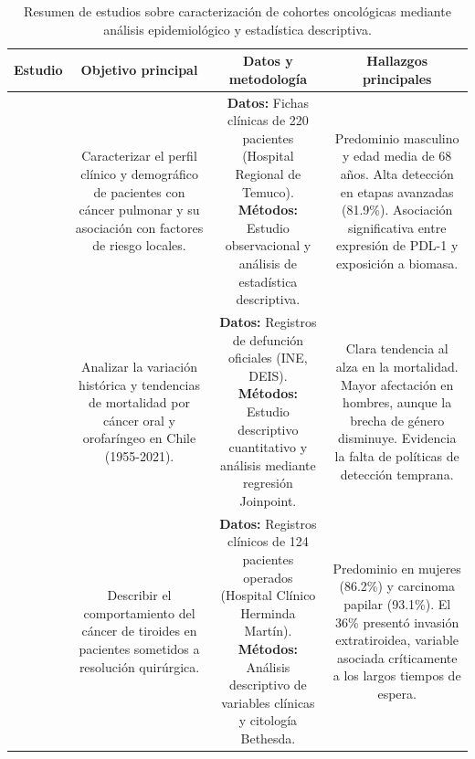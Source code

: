 \begin{table}[htbp]
\centering
\footnotesize
\setlength{\tabcolsep}{2pt}
\renewcommand{\arraystretch}{1.15}
\caption{Resumen de estudios sobre caracterización de cohortes oncológicas mediante análisis epidemiológico y estadística descriptiva.}
\label{tab:resumen_scielo}
\begin{tabular}{|c|c|c|c|}
\hline
\parbox[t]{1.2cm}{\centering\textbf{Estudio}} & \parbox[t]{4.0cm}{\centering\textbf{Objetivo principal}} & \parbox[t]{5.0cm}{\centering\textbf{Datos y metodología}} & \parbox[t]{5.0cm}{\centering\textbf{Hallazgos principales}} \\ \hline

\parbox[t]{1.2cm}{\centering \cite{scielo1}} & 
\parbox[t]{4.0cm}{Caracterizar el perfil clínico y demográfico de pacientes con cáncer pulmonar y su asociación con factores de riesgo locales.} & 
\parbox[t]{5.0cm}{\textbf{Datos:} Fichas clínicas de 220 pacientes (Hospital Regional de Temuco). \newline \textbf{Métodos:} Estudio observacional y análisis de estadística descriptiva.} & 
\parbox[t]{5.0cm}{Predominio masculino y edad media de 68 años. Alta detección en etapas avanzadas (81.9\%). Asociación significativa entre expresión de PDL-1 y exposición a biomasa.} \\ \hline

\parbox[t]{1.2cm}{\centering \cite{scielo2}} & 
\parbox[t]{4.0cm}{Analizar la variación histórica y tendencias de mortalidad por cáncer oral y orofaríngeo en Chile (1955-2021).} & 
\parbox[t]{5.0cm}{\textbf{Datos:} Registros de defunción oficiales (INE, DEIS). \newline \textbf{Métodos:} Estudio descriptivo cuantitativo y análisis mediante regresión Joinpoint.} & 
\parbox[t]{5.0cm}{Clara tendencia al alza en la mortalidad. Mayor afectación en hombres, aunque la brecha de género disminuye. Evidencia la falta de políticas de detección temprana.} \\ \hline

\parbox[t]{1.2cm}{\centering \cite{scielo3}} & 
\parbox[t]{4.0cm}{Describir el comportamiento del cáncer de tiroides en pacientes sometidos a resolución quirúrgica.} & 
\parbox[t]{5.0cm}{\textbf{Datos:} Registros clínicos de 124 pacientes operados (Hospital Clínico Herminda Martín). \newline \textbf{Métodos:} Análisis descriptivo de variables clínicas y citología Bethesda.} & 
\parbox[t]{5.0cm}{Predominio en mujeres (86.2\%) y carcinoma papilar (93.1\%). El 36\% presentó invasión extratiroidea, variable asociada críticamente a los largos tiempos de espera.} \\ \hline


\end{tabular}
\end{table}
